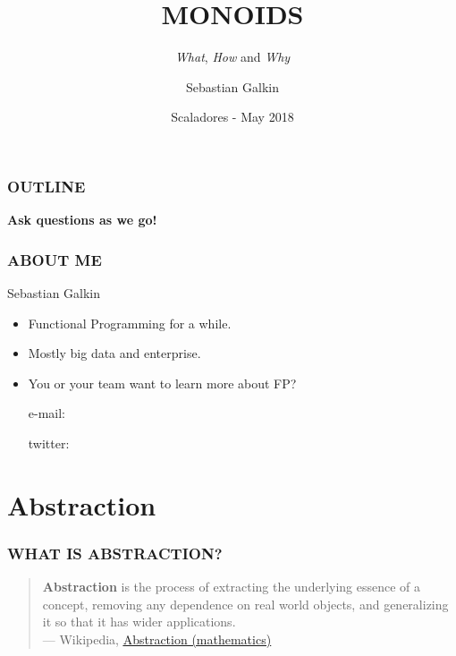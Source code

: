 \documentclass{beamer}
\title[Monoids]{MONOIDS}
\subtitle{\textit{What}, \textit{How} and \textit{Why}}
\author{Sebastian Galkin}
\institute[@paraseba]{\texttt{@paraseba} \\ \texttt{paraseba@gmail.com}}
\date[Scaladores]{Scaladores - May 2018}
\begin{document}


\begin{frame}
  \titlepage
\end{frame}

\begin{frame} \frametitle{OUTLINE}
  \tableofcontents
  \begin{block}{}
    \centering
    \Large \textbf{Ask questions as we go!}
  \end{block}
\end{frame}


\begin{frame} \frametitle{ABOUT ME}
  {\LARGE Sebastian Galkin}

  \begin{itemize}
  \item \alert{Functional Programming} for a while.
  \item Mostly big data and enterprise.
  \item You or your team want to learn more about FP?
    \vspace{4mm}

    {\addtolength{\parindent}{5mm}
      {\addtolength{\parindent}{5mm}
      e-mail: 

      twitter: 
      }
    }
  \end{itemize}
\end{frame}

\section{Abstraction}

\begin{frame} \frametitle{WHAT IS ABSTRACTION?}
  \begin{quote}
\textbf{Abstraction} is the process of extracting the underlying \alert{essence of a concept},
removing any \alert{dependence} on real world objects, and \alert{generalizing} it so that it
has \alert{wider applications.}\\[2ex] \rightline
  {{\rm --- Wikipedia, \href{https://en.wikipedia.org/wiki/Abstraction_(mathematics)}{\underline{Abstraction (mathematics)}}}}
  \end{quote}
\end{frame}
\end{document}
